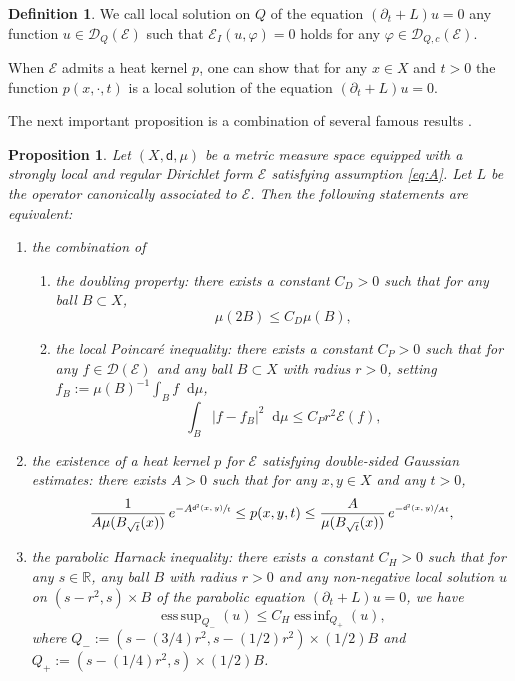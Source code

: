 \documentclass[10pt]{amsart}
\theoremstyle{plain}
\newtheorem{proposition}[theorem]{Proposition}
\theoremstyle{definition}
\newtheorem{definition}[theorem]{Definition}
\newcommand{\setR}{\mathbb{R}}
\newcommand{\cE}{\mathcal{E}}
\newcommand{\cD}{\mathcal{D}}
\let\phi\varphi
\newcommand{\di}{\mathop{}\!\mathrm{d}}
\newcommand{\dist}{\mathsf{d}}
\DeclareMathOperator*{\essssup}{ess\,sup}
\DeclareMathOperator*{\esssinf}{ess\,inf}
\begin{document}
\begin{definition}
We call local solution on $Q$ of the equation $(\partial_t+L)u = 0$ any function $u \in \cD_Q(\cE)$ such that $\cE_I(u,\phi)=0$ holds for any $\phi \in \cD_{Q,c}(\cE)$.
\end{definition}

When $\cE$ admits a heat kernel $p$, one can show that for any $x \in X$ and $t>0$ the function $p(x,\cdot,t)$ is a local solution of the equation $(\partial_t+L)u=0$.

The next important proposition is a combination of several famous results \cite{Grigor'yan92,Saloff-Coste,Sturm3}.

\begin{proposition}\label{prop:important}
Let $(X,\dist,\mu)$ be a metric measure space equipped with a strongly local and regular Dirichlet form $\cE$ satisfying assumption \eqref{eq:A}. Let $L$ be the operator canonically associated to $\cE$. Then the following statements are equivalent:
\begin{enumerate}
\item the combination of

\begin{enumerate}
\item
the doubling property: there exists a constant $C_D>0$ such that for any ball $B \subset X$,
\begin{equation}\label{eq:doubling}
\mu(2B)\le C_D \mu(B),
\end{equation}

\item
the local Poincaré inequality: there exists a constant $C_P>0$ such that for any $f \in \cD(\cE)$ and any ball $B \subset X$ with radius $r>0$, setting $f_B:= \mu(B)^{-1}\int_B f \di \mu$,
\begin{equation}\label{eq:Poincare}
\int_B |f-f_B|^2 \di \mu \le C_P r^2 \cE(f),
\end{equation}
\end{enumerate}

\item the existence of a heat kernel $p$ for $\cE$ satisfying double-sided Gaussian estimates: there exists $A>0$ such that for any $x,y \in X$ and any $t>0$,
\begin{equation}\label{eq:LiYau}
\frac{1}{A \mu(B_{\sqrt{t}}(x))}\, e^{-A\sfrac{\dist^2(x,y)}{t}} \le p(x,y,t) \le \frac{A}{\mu(B_{\sqrt{t}}(x))}\, e^{-\sfrac{\dist^2(x,y)}{At}},
\end{equation}

\item the parabolic Harnack inequality: there exists a constant $C_H>0$ such that for any $s\in \setR$, any ball $B$ with radius $r>0$ and any non-negative local solution $u$ on $(s-r^2,s)\times B$ of the parabolic equation $(\partial_t + L)u=0$, we have
\begin{equation}\label{eq:parabolicHarnack}
\essssup_{Q_-} (u) \le C_H \esssinf_{Q_+} (u),
\end{equation}
where $Q_-:=(s-(3/4)r^2,s-(1/2)r^2) \times (1/2)B$ and $Q_+:=(s-(1/4)r^2,s)\times (1/2)B$.
\end{enumerate}
\end{proposition}
\end{document}
